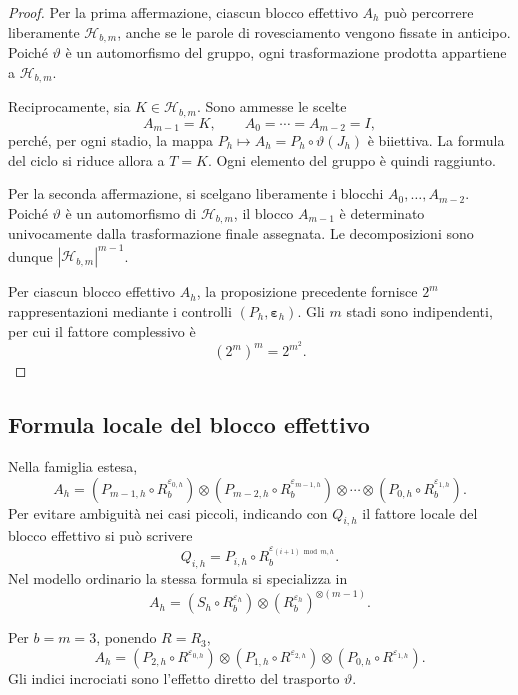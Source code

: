 	\begin{proof}
		Per la prima affermazione, ciascun blocco effettivo \(A_h\) può percorrere
		liberamente \(\mathcal H_{b,m}\), anche se le parole di rovesciamento vengono
		fissate in anticipo. Poiché \(\vartheta\) è un automorfismo del gruppo,
		ogni trasformazione prodotta appartiene a \(\mathcal H_{b,m}\).

		Reciprocamente, sia \(K\in\mathcal H_{b,m}\). Sono ammesse le scelte
		\[
		A_{m-1}=K,
		\qquad
		A_0=\cdots=A_{m-2}=I,
		\]
		perché, per ogni stadio, la mappa
		\(P_h\mapsto A_h=P_h\circ\vartheta(J_h)\) è biiettiva. La formula del
		ciclo si riduce allora a \(T=K\). Ogni elemento del gruppo è quindi
		raggiunto.

		Per la seconda affermazione, si scelgano liberamente i blocchi
		\(A_0,\dots,A_{m-2}\). Poiché \(\vartheta\) è un automorfismo di
		\(\mathcal H_{b,m}\), il blocco \(A_{m-1}\) è determinato univocamente
		dalla trasformazione finale assegnata. Le decomposizioni sono dunque
		\(|\mathcal H_{b,m}|^{m-1}\).

		Per ciascun blocco effettivo \(A_h\), la proposizione precedente fornisce
		\(2^m\) rappresentazioni mediante i controlli
		\((P_h,\boldsymbol{\varepsilon}_h)\). Gli \(m\) stadi sono indipendenti,
		per cui il fattore complessivo è
		\[
		(2^m)^m=2^{m^2}.
		\]
	\end{proof}

	\subsection{Formula locale del blocco effettivo}

	Nella famiglia estesa,
	\[
	A_h
	=
	(P_{m-1,h}\circ R_b^{\varepsilon_{0,h}})
	\otimes
	(P_{m-2,h}\circ R_b^{\varepsilon_{m-1,h}})
	\otimes\cdots\otimes
	(P_{0,h}\circ R_b^{\varepsilon_{1,h}}).
	\]
	Per evitare ambiguità nei casi piccoli, indicando con \(Q_{i,h}\) il
	fattore locale del blocco effettivo si può scrivere
	\[
	\boxed{
	Q_{i,h}
	=
	P_{i,h}\circ
	R_b^{\varepsilon_{(i+1)\bmod m,h}}.
	}
	\]
	Nel modello ordinario la stessa formula si specializza in
	\[
	A_h
	=
	(S_h\circ R_b^{\varepsilon_h})
	\otimes
	(R_b^{\varepsilon_h})^{\otimes(m-1)}.
	\]

	Per \(b=m=3\), ponendo \(R=R_3\),
	\begin{equation}\label{eq:Ah-ternario}
	A_h
	=
	(P_{2,h}\circ R^{\varepsilon_{0,h}})
	\otimes
	(P_{1,h}\circ R^{\varepsilon_{2,h}})
	\otimes
	(P_{0,h}\circ R^{\varepsilon_{1,h}}).
	\end{equation}
	Gli indici incrociati sono l'effetto diretto del trasporto \(\vartheta\).

